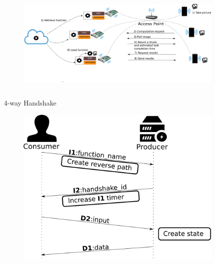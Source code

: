 \documentclass[final]{beamer}
\newlength{\sepwid}
\newlength{\onecolwid}
\newlength{\twocolwid}
\begin{document}
\begin{frame}[t]
\begin{columns}[t]
\begin{column}{\onecolwid}

\end{column} %

\begin{column}{\sepwid}\end{column} %

\begin{column}{\twocolwid} %

\begin{figure}
\includegraphics[width=1\linewidth]{img/scenario}
\end{figure}


\vspace{50pt}

\begin{columns}
\begin{column}{\onecolwid}
\begin{block}{4-way Handshake}
\begin{figure}
\includegraphics[width=1\linewidth]{img/handshake}
\end{figure}



\end{block}
\end{column}
\end{columns}
\end{column}
\end{columns}
\end{frame}
\end{document}

